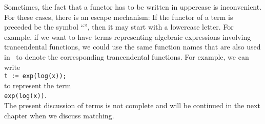Sometimes, the fact that a functor has to be written in uppercase is inconvenient.  For these cases,
there is an escape mechanism:  If the functor of a term is preceded be the symbol
``\texttt{}'', then it may start with a lowercase letter.  For example, if we want to
have terms representing algebraic expressions involving trancendental functions, we could use the
same function names that are also used in \setlx\ to denote the corresponding trancendental
functions.  For example, we can write
\\[0.2cm]
\hspace*{1.3cm}
\texttt{t := exp(log(x));}
\\[0.2cm]
to represent the term
\\[0.2cm]
\hspace*{1.3cm}
\texttt{exp(log(x))}.
\\[0.2cm]
The present discussion of terms is not complete and will be continued in the next chapter when we
discuss matching.



